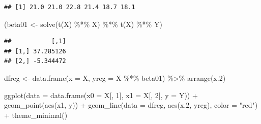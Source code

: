 \documentclass[
  12pt,
]{book}
\newenvironment{Shaded}{\begin{snugshade}}{\end{snugshade}}
\newcommand{\AttributeTok}[1]{\textcolor[rgb]{0.77,0.63,0.00}{#1}}
\newcommand{\DecValTok}[1]{\textcolor[rgb]{0.00,0.00,0.81}{#1}}
\newcommand{\FloatTok}[1]{\textcolor[rgb]{0.00,0.00,0.81}{#1}}
\newcommand{\FunctionTok}[1]{\textcolor[rgb]{0.00,0.00,0.00}{#1}}
\newcommand{\NormalTok}[1]{#1}
\newcommand{\OtherTok}[1]{\textcolor[rgb]{0.56,0.35,0.01}{#1}}
\newcommand{\SpecialCharTok}[1]{\textcolor[rgb]{0.00,0.00,0.00}{#1}}
\newcommand{\StringTok}[1]{\textcolor[rgb]{0.31,0.60,0.02}{#1}}
\theoremstyle{definition}
\theoremstyle{definition}
\theoremstyle{definition}
\theoremstyle{definition}
\theoremstyle{remark}
\begin{document}
\begin{Shaded}
\end{Shaded}

\begin{verbatim}
## [1] 21.0 21.0 22.8 21.4 18.7 18.1
\end{verbatim}

\begin{Shaded}
\begin{Highlighting}[]
\NormalTok{(beta01 }\OtherTok{\textless{}{-}} \FunctionTok{solve}\NormalTok{(}\FunctionTok{t}\NormalTok{(X) }\SpecialCharTok{\%*\%}\NormalTok{ X) }\SpecialCharTok{\%*\%} \FunctionTok{t}\NormalTok{(X) }\SpecialCharTok{\%*\%}\NormalTok{ Y)}
\end{Highlighting}
\end{Shaded}

\begin{verbatim}
##           [,1]
## [1,] 37.285126
## [2,] -5.344472
\end{verbatim}

\begin{Shaded}
\begin{Highlighting}[]
\NormalTok{dfreg }\OtherTok{\textless{}{-}} \FunctionTok{data.frame}\NormalTok{(}\AttributeTok{x =}\NormalTok{ X, }\AttributeTok{yreg =}\NormalTok{ X }\SpecialCharTok{\%*\%}\NormalTok{ beta01) }\SpecialCharTok{\%\textgreater{}\%}
    \FunctionTok{arrange}\NormalTok{(x}\FloatTok{.2}\NormalTok{)}
\end{Highlighting}
\end{Shaded}

\begin{Shaded}
\begin{Highlighting}[]
\FunctionTok{ggplot}\NormalTok{(}\AttributeTok{data =} \FunctionTok{data.frame}\NormalTok{(}\AttributeTok{x0 =}\NormalTok{ X[, }\DecValTok{1}\NormalTok{], }\AttributeTok{x1 =}\NormalTok{ X[, }\DecValTok{2}\NormalTok{],}
    \AttributeTok{y =}\NormalTok{ Y)) }\SpecialCharTok{+} \FunctionTok{geom\_point}\NormalTok{(}\FunctionTok{aes}\NormalTok{(x1, y)) }\SpecialCharTok{+} \FunctionTok{geom\_line}\NormalTok{(}\AttributeTok{data =}\NormalTok{ dfreg,}
    \FunctionTok{aes}\NormalTok{(x}\FloatTok{.2}\NormalTok{, yreg), }\AttributeTok{color =} \StringTok{"red"}\NormalTok{) }\SpecialCharTok{+} \FunctionTok{theme\_minimal}\NormalTok{()}
\end{Highlighting}
\end{Shaded}
\end{document}
